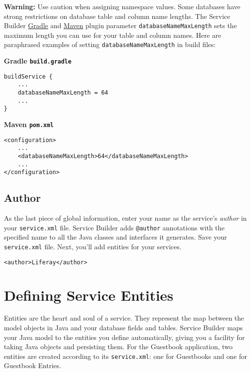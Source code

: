 \textbf{Warning:} Use caution when assigning namespace values. Some
databases have strong restrictions on database table and column name
lengths. The Service Builder
\href{/docs/7-2/reference/-/knowledge_base/r/service-builder-gradle-plugin\#task-properties}{Gradle}
and
\href{/docs/7-2/reference/-/knowledge_base/r/service-builder-plugin\#available-parameters}{Maven}
plugin parameter \texttt{databaseNameMaxLength} sets the maximum length
you can use for your table and column names. Here are paraphrased
examples of setting \texttt{databaseNameMaxLength} in build files:

\textbf{Gradle \texttt{build.gradle}}

\begin{verbatim}
buildService {
    ...
    databaseNameMaxLength = 64
    ...
}
\end{verbatim}

\textbf{Maven \texttt{pom.xml}}

\begin{verbatim}
<configuration>
    ...
    <databaseNameMaxLength>64</databaseNameMaxLength>
    ...
</configuration>
\end{verbatim}

\section{Author}\label{author}

As the last piece of global information, enter your name as the
service's \emph{author} in your \texttt{service.xml} file. Service
Builder adds \texttt{@author} annotations with the specified name to all
the Java classes and interfaces it generates. Save your
\texttt{service.xml} file. Next, you'll add entities for your services.

\begin{verbatim}
<author>Liferay</author>
\end{verbatim}

\chapter{Defining Service Entities}\label{defining-service-entities}

Entities are the heart and soul of a service. They represent the map
between the model objects in Java and your database fields and tables.
Service Builder maps your Java model to the entities you define
automatically, giving you a facility for taking Java objects and
persisting them. For the Guestbook application, two entities are created
according to its \texttt{service.xml}: one for Guestbooks and one for
Guestbook Entries.

